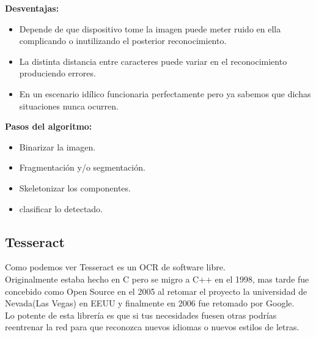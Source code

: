 \textbf{Desventajas:}
\begin{itemize}
\item Depende de que dispositivo tome la imagen puede meter ruido en ella complicando o inutilizando el posterior reconocimiento.
\item La distinta distancia entre caracteres puede variar en el reconocimiento produciendo errores.
\item En un escenario idílico funcionaria perfectamente pero ya sabemos que dichas situaciones nunca ocurren.
\end{itemize}

\textbf{Pasos del algoritmo:}
\begin{itemize}
\item Binarizar la imagen.
\item Fragmentación y/o segmentación.
\item Skeletonizar los componentes.
\item clasificar lo detectado.
\end{itemize}

\subsection{Tesseract}
Como podemos ver Tesseract\cite{wiki:Tesseract} es un OCR de software libre.\\
Originalmente estaba hecho en C pero se migro a C++ en el 1998, mas tarde fue concebido como Open Source en el 2005 al retomar el proyecto la universidad de Nevada(Las Vegas) en EEUU y finalmente en 2006 fue retomado por Google.\\

Lo potente de esta librería es que si tus necesidades fuesen otras podrías reentrenar la red para que reconozca nuevos idiomas o nuevos estilos de letras.



